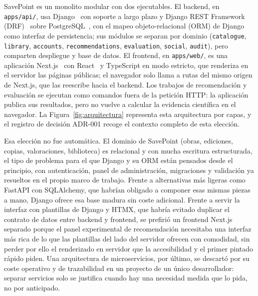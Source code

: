 SavePoint es un monolito modular con dos ejecutables. El backend, en \texttt{apps/api/}, usa
Django~\cite{django} con soporte a largo plazo y Django REST Framework (DRF)~\cite{drf} sobre
PostgreSQL~\cite{postgresql}, con el mapeo objeto-relacional (ORM) de Django como interfaz de
persistencia; sus módulos se separan por dominio (\texttt{catalogue}, \texttt{library},
\texttt{accounts}, \texttt{recommendations}, \texttt{evaluation}, \texttt{social},
\texttt{audit}), pero comparten despliegue y base de datos. El frontend, en
\texttt{apps/web/}, es una aplicación Next.js~\cite{nextjs} con React~\cite{react} y
TypeScript en modo estricto, que renderiza en el servidor las páginas públicas; el navegador
solo llama a rutas del mismo origen de Next.js, que las reescribe hacia el backend. Los
trabajos de recomendación y evaluación se
ejecutan como comandos fuera de la petición HTTP: la aplicación publica sus resultados, pero no
vuelve a calcular la evidencia científica en el navegador. La Figura~\ref{fig:arquitectura}
representa esta arquitectura por capas, y el registro de decisión ADR-001 recoge el contexto
completo de esta elección.

Esa elección no fue automática. El dominio de SavePoint (obras, ediciones, copias,
valoraciones, biblioteca) es relacional y con mucha escritura estructurada, el tipo de
problema para el que Django y su ORM están pensados desde el principio, con autenticación,
panel de administración, migraciones y validación ya resueltos en el propio marco de trabajo.
Frente a alternativas más ligeras como FastAPI con SQLAlchemy, que habrían obligado a componer
esas mismas piezas a mano, Django ofrece esa base madura sin coste adicional. Frente a servir
la interfaz con plantillas de Django y HTMX, que habría evitado duplicar el contrato de datos
entre backend y frontend, se prefirió un frontend Next.js separado porque el panel
experimental de recomendación necesitaba una interfaz más rica de lo que las plantillas del
lado del servidor ofrecen con comodidad, sin perder por ello el renderizado en servidor que la
accesibilidad y el primer pintado rápido piden. Una arquitectura de microservicios, por
último, se descartó por su coste operativo y de trazabilidad en un proyecto de un único
desarrollador: separar servicios solo se justifica cuando hay una necesidad medida que lo
pida, no por anticipado.

